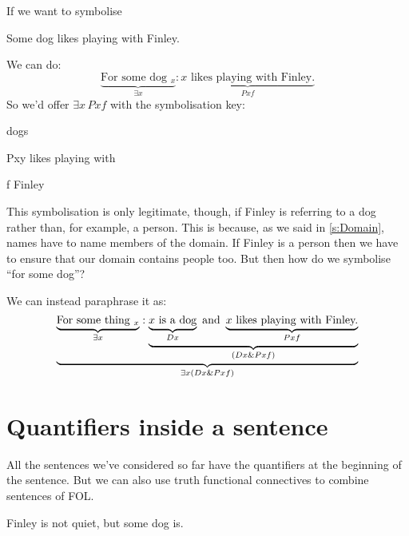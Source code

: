 If we want to symbolise 
\begin{earg}
	\item[\ex{lovesesomeonethemselves}] Some dog likes playing with Finley.
\end{earg}
We can do:
\begin{equation*}
\underbrace{\text{For some dog $_x$}}_{\exists x}: \underbrace{\text{$x$ likes playing with Finley.}}_{Pxf}
\end{equation*}
So we'd offer $\exists  x\, Pxf$ with the symbolisation key:
\begin{ekey}
\item[\text{domain}] dogs
\item[Pxy] likes playing with 
\item[f] Finley
\end{ekey}
This symbolisation is only legitimate, though, if Finley is referring to a dog rather than, for example, a person. This is because, as we said in \ref{s:Domain}, names have to name members of the domain. If Finley is a person then we have to ensure that our domain contains people too. But then how do we symbolise ``for some dog''? 

We can instead paraphrase it as:
\begin{equation*}
\underbrace{\underbrace{\text{For some thing $_x$}}_{\exists x}: \underbrace{
	\underbrace{\text{$x$ is a dog}}_{Dx}
	\text{ and } 
	\underbrace{\text{$x$ likes playing with Finley.}}_{Pxf}
}_{(Dx\mathbin{\&} Pxf)}}_{\exists x (Dx\mathbin{\&} Pxf)}
\end{equation*}

\section{Quantifiers inside a sentence}
All the sentences we've considered so far have the quantifiers at the beginning of the sentence. But we can also use truth functional connectives to combine sentences of FOL.


\begin{earg}
\item[\ex{q.dog}]Finley is not quiet, but some dog is.
\end{earg}

